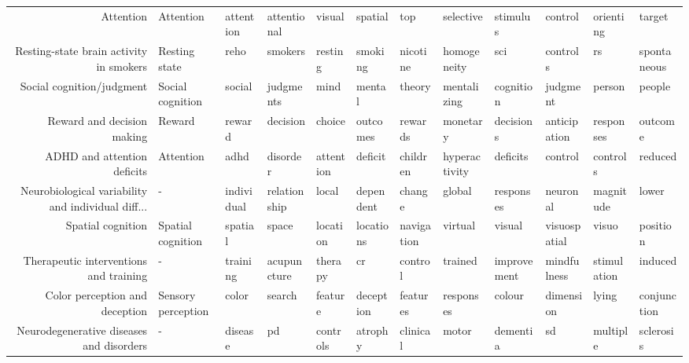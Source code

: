 \begin{tabular}{rlllllllllll}
                                         Attention &           Attention &        attention &   attentional &          visual &        spatial &         top &      selective &      stimulus &        control &     orienting &         target \\
           Resting-state brain activity in smokers &       Resting state &             reho &       smokers &         resting &        smoking &    nicotine &    homogeneity &           sci &       controls &            rs &    spontaneous \\
                         Social cognition/judgment &    Social cognition &           social &     judgments &            mind &         mental &      theory &    mentalizing &     cognition &       judgment &        person &         people \\
                        Reward and decision making &              Reward &           reward &      decision &          choice &       outcomes &     rewards &       monetary &     decisions &   anticipation &     responses &        outcome \\
                       ADHD and attention deficits &           Attention &             adhd &      disorder &       attention &        deficit &    children &  hyperactivity &      deficits &        control &      controls &        reduced \\
Neurobiological variability and individual diff... &                   - &       individual &  relationship &           local &      dependent &      change &         global &     responses &       neuronal &     magnitude &          lower \\
                                 Spatial cognition &   Spatial cognition &          spatial &         space &        location &      locations &  navigation &        virtual &        visual &   visuospatial &         visuo &       position \\
            Therapeutic interventions and training &                   - &         training &   acupuncture &         therapy &             cr &     control &        trained &   improvement &    mindfulness &   stimulation &        induced \\
                    Color perception and deception &  Sensory perception &            color &        search &         feature &      deception &    features &      responses &        colour &      dimension &         lying &    conjunction \\
          Neurodegenerative diseases and disorders &                   - &          disease &            pd &        controls &        atrophy &    clinical &          motor &      dementia &             sd &      multiple &      sclerosis \\

\end{tabular}
